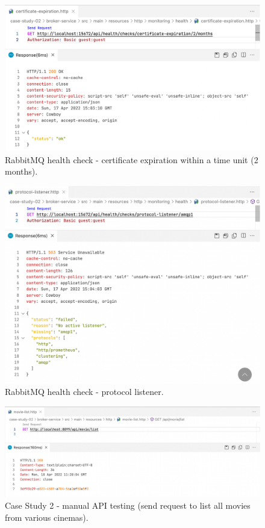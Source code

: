 \begin{figure}[H]
  \centering
  \includegraphics[width=1.0\linewidth]{./assets/images/case-studies/cs02-hc3.png}
  \caption{RabbitMQ health check - certificate expiration within a time unit (2 months).}
  \label{fig:cs02-hc3}
\end{figure}

\begin{figure}[H]
  \centering
  \includegraphics[width=1.0\linewidth]{./assets/images/case-studies/cs02-hc5.png}
  \caption{RabbitMQ health check - protocol listener.}
  \label{fig:cs02-hc5}
\end{figure}


\begin{figure}[H]
  \centering
  \includegraphics[width=1.0\linewidth]{./assets/images/case-studies/cs02-manual-1.png}
  \caption{Case Study 2 - manual API testing (send request to list all movies from various cinemas).}
  \label{fig:cs02-manual-1}
\end{figure}

